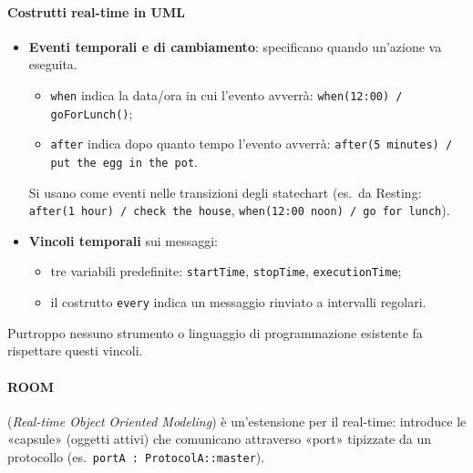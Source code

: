 \documentclass[a4paper,12pt]{article}
\begin{document}
\paragraph{Costrutti real-time in UML}
\begin{itemize}
  \item \textbf{Eventi temporali e di cambiamento}: specificano quando un'azione va
        eseguita.
  \begin{itemize}
    \item \texttt{when} indica la data/ora in cui l'evento avverrà:
          \texttt{when(12:00) / goForLunch()};
    \item \texttt{after} indica dopo quanto tempo l'evento avverrà:
          \texttt{after(5 minutes) / put the egg in the pot}.
  \end{itemize}
  Si usano come eventi nelle transizioni degli statechart (es.\ da
  \textsf{Resting}: \texttt{after(1 hour) / check the house},
  \texttt{when(12:00 noon) / go for lunch}).
  \item \textbf{Vincoli temporali} sui messaggi:
  \begin{itemize}
    \item tre variabili predefinite: \texttt{startTime}, \texttt{stopTime},
          \texttt{executionTime};
    \item il costrutto \texttt{every} indica un messaggio rinviato a intervalli
          regolari.
  \end{itemize}
\end{itemize}
\begin{center}
\end{center}
Purtroppo nessuno strumento o linguaggio di programmazione esistente fa rispettare questi
vincoli.

\paragraph{ROOM} (\emph{Real-time Object Oriented Modeling}) è un'estensione per il
real-time: introduce le «capsule» (oggetti attivi) che
comunicano attraverso «port» tipizzate da un protocollo
(es.\ \texttt{portA : ProtocolA::master}).
\end{document}
